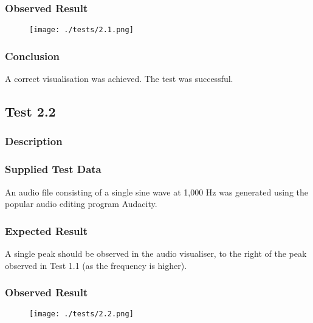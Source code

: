 \subsubsection{Observed Result}
\label{sec:evidence2.1}
\begin{figure}[H]
	\texttt{[image: ./tests/2.1.png]}
\end{figure}

\subsubsection{Conclusion}
A correct visualisation was achieved. The test was successful.

\pagebreak
\subsection{Test 2.2}
\subsubsection{Description}
\paragraph{}
{
	\centering
}

\subsubsection{Supplied Test Data}
An audio file consisting of a single sine wave at 1,000 Hz was generated using the popular audio editing program Audacity.

\subsubsection{Expected Result}
A single peak should be observed in the audio visualiser, to the right of the peak observed in Test 1.1 (as the frequency is higher).

\subsubsection{Observed Result}
\label{sec:evidence2.2}
\begin{figure}[H]
	\texttt{[image: ./tests/2.2.png]}
\end{figure}

